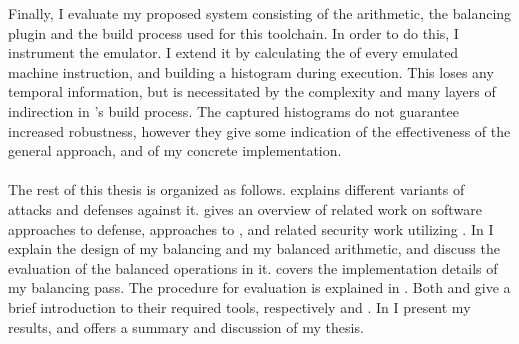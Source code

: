 Finally, I evaluate my proposed system consisting of the arithmetic, the balancing plugin and the build process used for this toolchain.
In order to do this, I instrument the \qemu{} emulator.
I extend it by calculating the \hammingw{} of every emulated machine instruction, and building a histogram during execution.
This loses any temporal information, but is necessitated by the complexity and many layers of indirection in \qemu{}'s build process.
The captured histograms do not guarantee increased robustness, however they give some indication of the effectiveness of the general approach, and of my concrete implementation.
\\
\\
The rest of this thesis is organized as follows.
 explains different variants of \poweranalysis{} attacks and defenses against it.
 gives an overview of related work on software approaches to \poweranalysis{} defense, approaches to \dual{}, and related security work utilizing \llvm{}.
In  I explain the design of my balancing and my balanced arithmetic, and discuss the evaluation of the balanced operations in it.
 covers the implementation details of my balancing pass.
The procedure for evaluation is explained in .
Both  and  give a brief introduction to their required tools, respectively \llvm{} and \qemu{}.
In  I present my results, and  offers a summary and discussion of my thesis.
